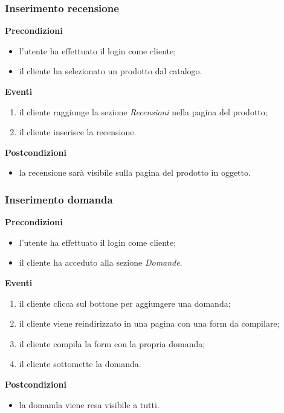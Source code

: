 \documentclass[a4paper, 14pt]{article}
\begin{document}
\begin{flushleft}
			\subsubsection{Inserimento recensione}
			\textbf{Precondizioni}
			\begin{itemize}
				\item l'utente ha effettuato il login come cliente;
				\item il cliente ha selezionato un prodotto dal catalogo.
			\end{itemize}
			\textbf{Eventi}
			\begin{enumerate}
				\item il cliente raggiunge la sezione \textit{Recensioni} nella pagina del prodotto;
				\item il cliente inserisce la recensione.
			\end{enumerate}
			\textbf{Postcondizioni}
			\begin{itemize}
				\item la recensione sarà visibile sulla pagina del prodotto in oggetto.
			\end{itemize}
			
			\bigskip
			\subsubsection{Inserimento domanda}
			\textbf{Precondizioni}
			\begin{itemize}
				\item l'utente ha effettuato il login come cliente;
				\item il cliente ha acceduto alla sezione \textit{Domande}.
			\end{itemize}
			\textbf{Eventi}
			\begin{enumerate}
				\item il cliente clicca sul bottone per aggiungere una domanda;
				\item il cliente viene reindirizzato in una pagina con una form da compilare;
				\item il cliente compila la form con la propria domanda;
				\item il cliente sottomette la domanda.
			\end{enumerate}
			\textbf{Postcondizioni}
			\begin{itemize}
				\item la domanda viene resa visibile a tutti.
			\end{itemize}
			
			\bigskip

\end{flushleft}
\end{document}
